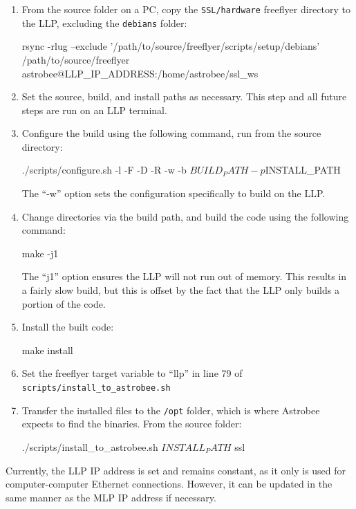 \documentclass{article}
\begin{document}
\begin{enumerate}
    \item From the source folder on a PC, copy the \texttt{SSL/hardware} freeflyer directory to the LLP, excluding the \texttt{debians} folder:
    \begin{markdown}
    rsync -rlug --exclude '/path/to/source/freeflyer/scripts/setup/debians' 
    /path/to/source/freeflyer astrobee@{LLP_IP_ADDRESS}:/home/astrobee/ssl_ws
    \end{markdown}
    \item Set the source, build, and install paths as necessary. This step and all future steps are run on an LLP terminal.
    \item Configure the build using the following command, run from the source directory:
    \begin{markdown}
    ./scripts/configure.sh -l -F -D -R -w -b $BUILD_PATH -p $INSTALL_PATH
    \end{markdown}
    The ``-w'' option sets the configuration specifically to build on the LLP.
    \item Change directories via the build path, and build the code using the following command:
    \begin{markdown}
    make -j1
    \end{markdown}
    The ``j1'' option ensures the LLP will not run out of memory. This results in a fairly slow build, but this is offset by the fact that the LLP only builds a portion of the code.
    \item Install the built code:
    \begin{markdown}
    make install
    \end{markdown}
    \item Set the freeflyer target variable to ``llp'' in line 79 of  \texttt{scripts/install\_to\_astrobee.sh}
    \item Transfer the installed files to the \texttt{/opt} folder, which is where Astrobee expects to find the binaries. From the source folder:
    \begin{markdown}
    ./scripts/install_to_astrobee.sh $INSTALL_PATH$ ssl
    \end{markdown}
\end{enumerate}

Currently, the LLP IP address is set and remains constant, as it only is used for computer-computer Ethernet connections. However, it can be updated in the same manner as the MLP IP address if necessary.
\end{document}
